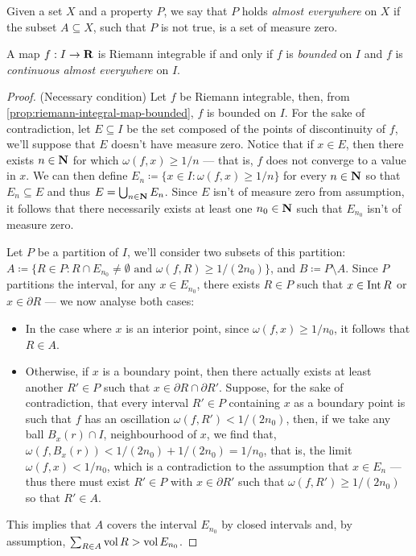\begin{notation}
Given a set \(X\) and a property \(P\), we say that \(P\) holds \emph{almost
everywhere} on \(X\) if the subset \(A \subseteq X\), such that \(P\) is not
true, is a set of measure zero.
\end{notation}

\begin{theorem}
\label{thm:lebesgue-criterion-integrable}
A map \(f: I \to \mathbf{R}\) is Riemann integrable if and only if \(f\) is
\emph{bounded} on \(I\) and \(f\) is \emph{continuous almost everywhere} on
\(I\).
\end{theorem}

\begin{proof}
(Necessary condition) Let \(f\) be Riemann integrable, then, from
\cref{prop:riemann-integral-map-bounded}, \(f\) is bounded on \(I\). For the
sake of contradiction, let \(E \subseteq I\) be the set composed of the points
of discontinuity of \(f\), we'll suppose that \(E\) doesn't have measure
zero. Notice that if \(x \in E\), then there exists \(n \in \mathbf{N}\) for which
\(\omega(f, x) \geq 1/n\) --- that is, \(f\) does not converge to a value in
\(x\). We can then define \(E_n \coloneq \{x \in I : \omega(f, x) \geq 1/n\}\)
for every \(n \in \mathbf{N}\) so that \(E_n \subseteq E\) and thus \(E = \bigcup_{n \in
\mathbf{N}} E_n\). Since \(E\) isn't of measure zero from assumption, it follows that
there necessarily exists at least one \(n_0 \in \mathbf{N}\) such that \(E_{n_0}\) isn't
of measure zero.

Let \(P\) be a partition of \(I\), we'll consider two subsets of this partition:
\(A \coloneq \{R \in P : R \cap E_{n_{0}} \neq \emptyset \text{ and } \omega(f,
R) \geq 1/(2n_0)\}\), and \(B \coloneq P \setminus A\). Since \(P\) partitions
the interval, for any \(x \in E_{n_0}\), there exists \(R \in P\) such that \(x
\in \operatorname{Int} R\) or \(x \in \partial R\) --- we now analyse both cases:
\begin{itemize}\setlength\itemsep{0em}
\item In the case where \(x\) is an interior point, since \(\omega(f, x) \geq
  1/n_0\), it follows that \(R \in A\).
\item Otherwise, if \(x\) is a boundary point, then there actually exists at
  least another \(R' \in P\) such that \(x \in \partial R \cap \partial
  R'\). Suppose, for the sake of contradiction, that every interval \(R' \in P\)
  containing \(x\) as a boundary point is such that \(f\) has an oscillation
  \(\omega(f, R') < 1/(2n_0)\), then, if we take any ball \(B_x(r) \cap I\),
  neighbourhood of \(x\), we find that, \(\omega(f, B_x(r)) < 1/(2n_0) +
  1/(2n_0) = 1/n_0\), that is, the limit \(\omega(f, x) < 1/n_0\), which is a
  contradiction to the assumption that \(x \in E_n\) --- thus there must exist
  \(R' \in P\) with \(x \in \partial R'\) such that \(\omega(f, R') \geq
  1/(2n_0)\) so that \(R' \in A\).
\end{itemize}
This implies that \(A\) covers the interval \(E_{n_0}\) by closed intervals and,
by assumption, \(\sum_{R \in A} \operatorname{vol} R > \operatorname{vol} E_{n_0}\).


\end{proof}
